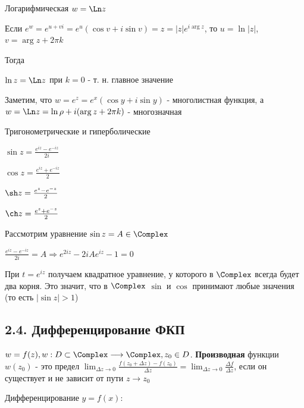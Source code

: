 \documentclass[12pt]{article}
\begin{document}
 Логарифмическая $w = \Ln z$

Если $e^w = e^{u + vi} = e^u (\cos v + i \sin v) = z = |z| e^{i\arg z}$, то $u = \ln |z|$, $v = \arg z + 2\pi k$

Тогда 

$\ln z = \Ln z$ при $k = 0$ - т. н. главное значение










Заметим, что $w = e^z = e^x (\cos y + i \sin y)$ - многолистная функция, а $w = \Ln z = \ln \rho + i (\arg z + 2\pi k)$ - многозначная

 Тригонометрические и гиперболические

\begin{multicols}{2}
    \begin{center}
        $\sin z = \frac{e^{iz} - e^{-iz}}{2i}$

        $\cos z = \frac{e^{iz} + e^{-iz}}{2}$

        $\sh z = \frac{e^{z} - e^{-z}}{2}$

        $\ch z = \frac{e^{z} + e^{-z}}{2}$
    \end{center}
\end{multicols}

\Nota Рассмотрим уравнение $\sin z = A \in \Complex$

$\frac{e^{iz} - e^{-iz}}{2i} = A \Longrightarrow e^{2iz} - 2iAe^{iz} - 1 = 0$

При $t = e^{iz}$ получаем квадратное уравнение, у которого в $\Complex$ всегда будет два корня. 
Это значит, что в $\Complex$ $\sin$ и $\cos$ принимают любые значения (то есть $|\sin z| > 1$)

\subsection{2.4. Дифференцирование ФКП}

\Def $w = f(z), w : D \subset \Complex \longrightarrow \Complex, z_0 \in D$. \textbf{Производная} функции
$w(z_0)$ - это предел $\lim_{\Delta z \to 0} \frac{f(z_0 + \Delta z) - f(z_0)}{\Delta z} = \lim_{\Delta z \to 0} \frac{\Delta f}{\Delta z}$, 
если он существует и не зависит от пути $z \to z_0$

\Mem Дифференцирование $y = f(x)$:
\end{document}
